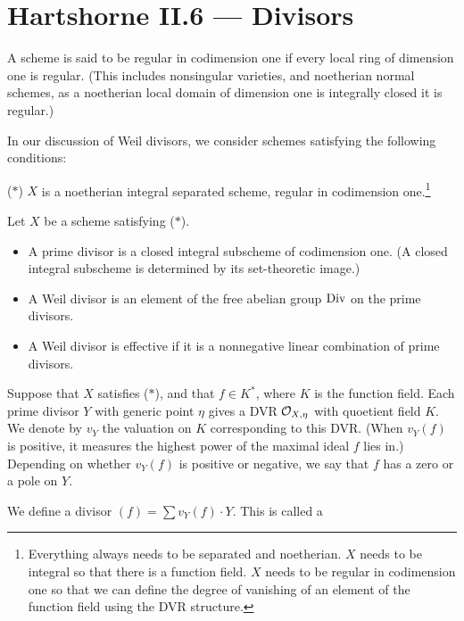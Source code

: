 \documentclass[11pt]{article}
\begin{document}
\section*{Hartshorne II.6 --- Divisors}
\begin{itemise}
\item A scheme is said to be regular in
codimension one if every local ring of dimension one is regular. {\small (This
includes nonsingular varieties, and noetherian normal schemes, as a noetherian
local domain of dimension one is integrally closed \Iff it is regular.)}
\item In our discussion of Weil divisors, we consider schemes satisfying the
following conditions:
\begin{itemise}
\item[($*$)] $X$ is a noetherian integral separated scheme, regular in
codimension one.\footnote{Everything always needs to be separated and
noetherian. $X$ needs to be integral so that there is a function field. $X$
needs to be regular in codimension one so that we can define the degree of
vanishing of an element of the function field using the DVR
structure.}
\end{itemise}
\item Let $X$ be a scheme satisfying ($*$). 
\begin{itemize}\squishlist
\item A prime divisor is a closed integral subscheme of
codimension one. {\small (A closed integral subscheme is determined by its
set-theoretic image.)}
\item A  Weil divisor is an element of the free abelian
group $\textup{Div}$ on the prime divisors.
\item A Weil divisor is effective  if it is a
nonnegative linear combination of prime divisors.
\end{itemize}
\item Suppose that $X$ satisfies ($*$), and that $f\in K^*$, where $K$ is the
function field. Each prime divisor $Y$ with generic point $\eta$ gives a DVR
$\mathcal{O}_{X,\eta}$ with quoetient field $K$. We denote by $v_Y$ the valuation on
$K$ corresponding to this DVR. {\small (When $v_Y(f)$ is positive, it measures
the highest power of the maximal ideal $f$ lies in.)} Depending on whether
$v_Y(f)$ is positive or negative, we say that $f$ has a zero or a pole on $Y$.
\item We define a divisor $(f)=\sum v_Y(f)\cdot Y$. This is called a

\end{itemise}
\end{document}
